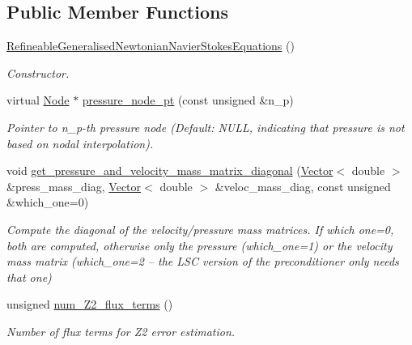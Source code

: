 \subsection*{Public Member Functions}
\begin{DoxyCompactItemize}
\item 
\hyperlink{classoomph_1_1RefineableGeneralisedNewtonianNavierStokesEquations_a90b768448667ce9aa7932c76f9d4bc88}{Refineable\+Generalised\+Newtonian\+Navier\+Stokes\+Equations} ()
\begin{DoxyCompactList}\small\item\em Constructor. \end{DoxyCompactList}\item 
virtual \hyperlink{classoomph_1_1Node}{Node} $\ast$ \hyperlink{classoomph_1_1RefineableGeneralisedNewtonianNavierStokesEquations_a7192c00c8efe7f1bc48d28122f120899}{pressure\+\_\+node\+\_\+pt} (const unsigned \&n\+\_\+p)
\begin{DoxyCompactList}\small\item\em Pointer to n\+\_\+p-\/th pressure node (Default\+: N\+U\+LL, indicating that pressure is not based on nodal interpolation). \end{DoxyCompactList}\item 
void \hyperlink{classoomph_1_1RefineableGeneralisedNewtonianNavierStokesEquations_af66689b596908f67bf4af1ad9d6c11eb}{get\+\_\+pressure\+\_\+and\+\_\+velocity\+\_\+mass\+\_\+matrix\+\_\+diagonal} (\hyperlink{classoomph_1_1Vector}{Vector}$<$ double $>$ \&press\+\_\+mass\+\_\+diag, \hyperlink{classoomph_1_1Vector}{Vector}$<$ double $>$ \&veloc\+\_\+mass\+\_\+diag, const unsigned \&which\+\_\+one=0)
\begin{DoxyCompactList}\small\item\em Compute the diagonal of the velocity/pressure mass matrices. If which one=0, both are computed, otherwise only the pressure (which\+\_\+one=1) or the velocity mass matrix (which\+\_\+one=2 -- the L\+SC version of the preconditioner only needs that one) \end{DoxyCompactList}\item 
unsigned \hyperlink{classoomph_1_1RefineableGeneralisedNewtonianNavierStokesEquations_afed7aa29e3771db16a3f57a1eae2dbb2}{num\+\_\+\+Z2\+\_\+flux\+\_\+terms} ()
\begin{DoxyCompactList}\small\item\em Number of \textquotesingle{}flux\textquotesingle{} terms for Z2 error estimation. \end{DoxyCompactList}\item 

\end{DoxyCompactItemize}

